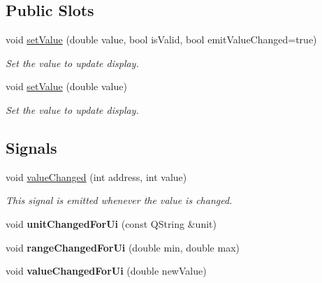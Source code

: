 \subsection*{Public Slots}
\begin{DoxyCompactItemize}
\item 
void \hyperlink{classmdt_analog_io_ac83abbda2bafce5c02e3ae1dbc5e2555}{setValue} (double value, bool isValid, bool emitValueChanged=true)
\begin{DoxyCompactList}\small\item\em Set the value to update display. \end{DoxyCompactList}\item 
void \hyperlink{classmdt_analog_io_a9729875cb13fa2069e40c9abce914870}{setValue} (double value)
\begin{DoxyCompactList}\small\item\em Set the value to update display. \end{DoxyCompactList}\end{DoxyCompactItemize}
\subsection*{Signals}
\begin{DoxyCompactItemize}
\item 
void \hyperlink{classmdt_analog_io_ac36d804e82a4ca9401687700e9e6a136}{valueChanged} (int address, int value)
\begin{DoxyCompactList}\small\item\em This signal is emitted whenever the value is changed. \end{DoxyCompactList}\item 
\hypertarget{classmdt_analog_io_aa81b49605f601850ecfa780f2b758e98}{
void {\bfseries unitChangedForUi} (const QString \&unit)}
\label{classmdt_analog_io_aa81b49605f601850ecfa780f2b758e98}

\item 
\hypertarget{classmdt_analog_io_a40735cbbf852790067a6f9b57aac4aa3}{
void {\bfseries rangeChangedForUi} (double min, double max)}
\label{classmdt_analog_io_a40735cbbf852790067a6f9b57aac4aa3}

\item 
\hypertarget{classmdt_analog_io_aaef16a200f5a862356eaeb4a65a1e06f}{
void {\bfseries valueChangedForUi} (double newValue)}
\label{classmdt_analog_io_aaef16a200f5a862356eaeb4a65a1e06f}

\end{DoxyCompactItemize}
